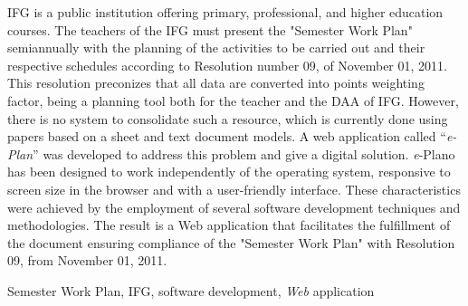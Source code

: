 IFG is a public institution offering primary, professional, and higher education courses.
The teachers of the IFG must present the "Semester Work Plan" semiannually with the planning of the activities to be carried out and their respective schedules according to Resolution number 09, of November 01, 2011.
This resolution preconizes that all data are converted into points weighting factor, being a planning tool both for the teacher and the \acf{DAA} of \ac{IFG}.
However, there is no system to consolidate such a resource, which is currently done using papers based on a sheet and text document models.
A web application called ``{\it e-Plan}'' was developed to address this problem and give a digital solution.
\textit{e}-Plano has been designed to work independently of the operating system, responsive to screen size in the browser and with a user-friendly interface.
These characteristics were achieved by the employment of several software development techniques and methodologies.
The result is a Web application that facilitates the fulfillment of the document ensuring compliance of the "Semester Work Plan" with Resolution 09, from November 01, 2011.

\begin{keywords}
Semester Work Plan, IFG, software development, \textit{Web} application
\end{keywords}